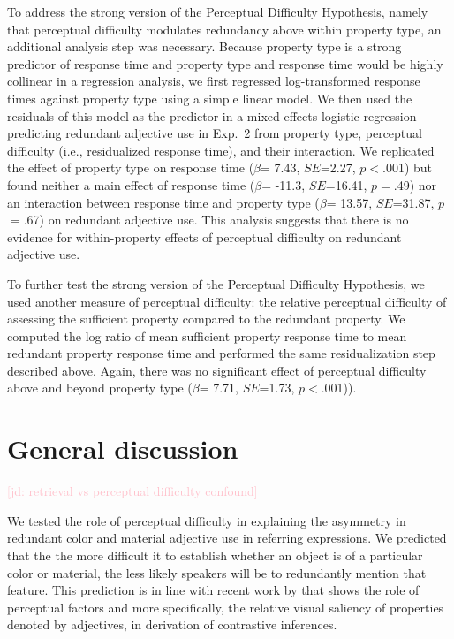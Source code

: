 \documentclass[12pt,letterpaper]{article}
\newcommand{\jd}[1]{\textcolor{Pink}{[jd: #1]}}
\begin{document}
To address the strong version of the Perceptual Difficulty Hypothesis, namely that perceptual difficulty modulates redundancy above within property type, an additional analysis step was necessary. Because property type is a strong predictor of response time and property type and response time would be highly collinear in a regression analysis, we first regressed log-transformed response times against property type using a simple linear model. %
We then used the residuals of this model as the predictor in a mixed effects logistic regression predicting redundant adjective use in Exp.~2 from property type, perceptual difficulty (i.e., residualized response time), and their interaction. We replicated the effect of property type on response time ($\beta$= 7.43, $SE$=2.27, $p$$<$.001) but found neither a main effect of response time ($\beta$= -11.3, $SE$=16.41, $p$$=$.49) nor an interaction between response time and property type ($\beta$= 13.57, $SE$=31.87, $p$$=$.67) on redundant adjective use. This analysis suggests that there is no evidence for within-property effects of perceptual difficulty on redundant adjective use.

To further test the strong version of the Perceptual Difficulty Hypothesis, we used another measure of perceptual difficulty: the relative perceptual difficulty of assessing the sufficient property compared to the redundant property. We computed the log ratio of mean sufficient property response time to   mean redundant property response time and performed the same residualization step described above. Again, there was no significant effect of perceptual difficulty above and beyond property type ($\beta$= 7.71, $SE$=1.73, $p$$<$.001)).


\section{General discussion} 

\jd{retrieval vs perceptual difficulty confound} 

We tested the role of perceptual difficulty in explaining the asymmetry in redundant color and material adjective use in referring expressions. We predicted that the the more difficult it to establish whether an object is of a particular color or material, the less likely speakers will be to redundantly mention that feature. This prediction is in line with recent work by \citet{RubioEtAl2019} that shows the role of perceptual factors and more specifically, the relative visual saliency of properties denoted by adjectives, in derivation of contrastive inferences.
\end{document}
